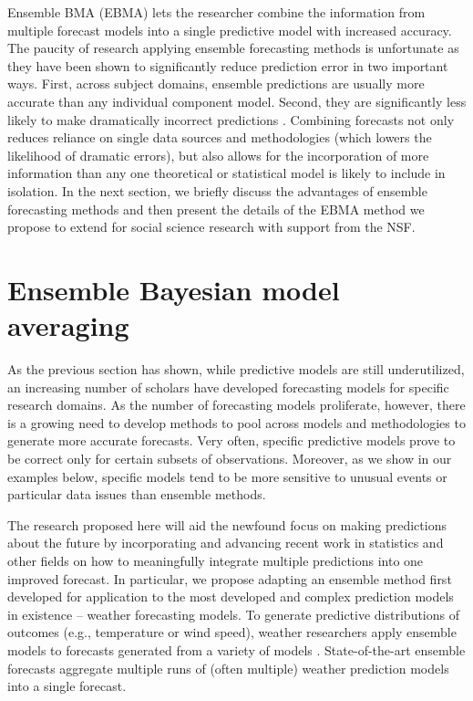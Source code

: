 \documentclass[pdftex,12pt,fullpage,oneside]{amsart}
\begin{document}
Ensemble BMA (EBMA) lets the researcher combine the information from multiple forecast models into a single predictive model with increased accuracy. The paucity of research applying ensemble forecasting methods is
unfortunate as they have been shown to significantly reduce prediction
error in two important ways.  First, across subject domains, ensemble
predictions are usually more accurate than any individual component
model. Second, they are significantly less likely to make dramatically
incorrect predictions \citep{Armstrong:2001, Raftery:2005}.  Combining
forecasts not only reduces reliance on single data sources and
methodologies (which lowers the likelihood of dramatic errors), but
also allows for the incorporation of more information than any one
theoretical or statistical model is likely to include in isolation.
In the next section, we briefly discuss the advantages of ensemble
forecasting methods and then present the details of the EBMA method we
propose to extend for social science research with support from the
NSF.

\setcounter{section}{1}

\section{Ensemble Bayesian model averaging} 

As the previous section has shown, while predictive models are still
underutilized, an increasing number of scholars have developed
forecasting models for specific research domains.  As the number of
forecasting models proliferate, however, there is a growing need to
develop methods to pool across models and methodologies to generate
more accurate forecasts.  Very often, specific predictive models prove
to be correct only for certain subsets of observations.  Moreover, as
we show in our examples below, specific models tend to be more
sensitive to unusual events or particular data issues than ensemble
methods.  

The research proposed here will aid the newfound focus on making
predictions about the future by incorporating and advancing recent
work in statistics and other fields on how to meaningfully integrate
multiple predictions into one improved forecast.  In particular, we
propose adapting an ensemble method first developed for application to
the most developed and complex prediction models in existence --
weather forecasting models.  To generate predictive distributions of
outcomes (e.g., temperature or wind speed), weather researchers apply
ensemble models to forecasts generated from a
variety of models \citep{Raftery:2005}.  State-of-the-art ensemble
forecasts aggregate multiple runs of (often multiple) weather
prediction models into a single forecast.
\end{document}
